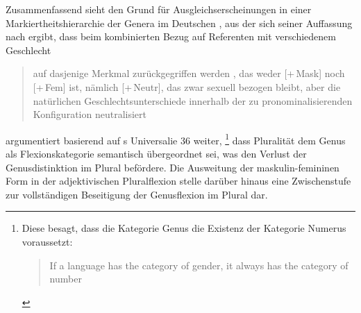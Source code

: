 Zusammenfassend sieht \citeauthor{askedal1973} den Grund für
Ausgleichserscheinungen in einer Markiertheitshierarchie der Genera im
Deutschen \autocite[241--247]{askedal1973}, aus der sich seiner Auffassung nach
ergibt, dass beim kombinierten Bezug auf Referenten mit verschiedenem
Geschlecht \blockcquote[253]{askedal1973}{auf dasjenige Merkmal zurückgegriffen
werden , das weder [+\,Mask] noch [+\,Fem] ist, nämlich
[+\,Neutr], das zwar sexuell bezogen bleibt, aber die natürlichen
Geschlechts\-unterschiede innerhalb der zu pronominalisierenden Konfiguration
neutralisiert}. \citet[173--177]{askedal1973} argumentiert basierend auf
\citeauthor{greenberg1966}s Universalie 36 weiter,%
%
	\footnote{Diese besagt, dass die Kategorie Genus die Existenz der Kategorie
		Numerus voraussetzt:
		\foreignblockcquote{english}[112]{greenberg1966}{If a language has
		the category of gender, it always has the category of number}.%
	}
%
dass Pluralität dem Genus als Flexionskategorie semantisch übergeordnet sei,
was den Verlust der Genusdistinktion im Plural befördere. Die Ausweitung der
maskulin-femininen Form in der adjektivischen Plural\-flexion stelle darüber
hinaus eine Zwischenstufe zur vollständigen Beseitigung der Genusflexion im
Plural dar.

